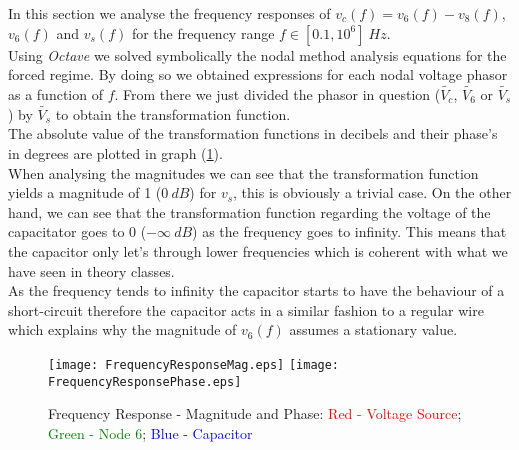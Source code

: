 In this section we analyse the frequency responses of $v_c(f) = v_6(f) - v_8(f)$, $v_6(f)$ and $v_s(f)$ for the 
frequency range $f \in [0.1, 10^6] \:Hz$.
\\
Using \emph{Octave} we solved symbolically the nodal method analysis equations for the forced regime.
By doing so we obtained expressions for each nodal voltage phasor as a function of $f$. From there we just divided 
the phasor in question ($\widetilde{V_c}$, $\widetilde{V_6}$ or $\widetilde{V_s}$) by $\widetilde{V_s}$ to obtain
the transformation function. 
\\
The absolute value of the transformation functions in decibels and their phase's in degrees
are plotted in graph (\ref{fig:FrequencyResponseAna}).
\\
When analysing the magnitudes we can see that the transformation function yields a magnitude of 1 ($0\: dB$) for $v_s$, this is obviously
a trivial case. On the other hand, we can see that the transformation function regarding the voltage of the capacitator goes to 0 ($-\infty\: dB$)
as the frequency goes to infinity. This means that the capacitor only let's through lower frequencies which is 
coherent with what we have seen in theory classes.
\\
As the frequency tends to infinity the capacitor starts to have the behaviour of a short-circuit therefore the capacitor acts in a similar fashion to a regular
wire which explains why the magnitude of $v_6(f)$ assumes a stationary value.

\begin{figure}[H]
    \centering
    \texttt{[image: FrequencyResponseMag.eps]}
    \texttt{[image: FrequencyResponsePhase.eps]}
    \caption{Frequency Response - Magnitude and Phase: \textcolor{red}{Red - Voltage Source}; \textcolor{green}{Green - Node 6}; \textcolor{blue}{Blue - Capacitor}}
    \label{fig:FrequencyResponseAna}
\end{figure}